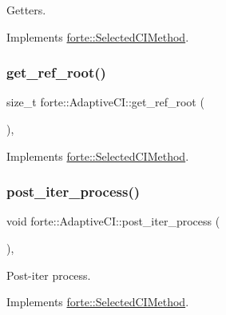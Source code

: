 Getters. 



Implements \mbox{\hyperlink{classforte_1_1_selected_c_i_method_a2c29d8700d6887860850f77b9246ec9f}{forte\+::\+Selected\+C\+I\+Method}}.

\mbox{\label{classforte_1_1_adaptive_c_i_a770022fec5ed4819e58670155e7fd5fc}} 
\subsubsection{\texorpdfstring{get\+\_\+ref\+\_\+root()}{get\_ref\_root()}}
{\footnotesize\ttfamily size\+\_\+t forte\+::\+Adaptive\+C\+I\+::get\+\_\+ref\+\_\+root (\begin{DoxyParamCaption}{ }\end{DoxyParamCaption})\hspace{0.3cm}{\ttfamily [override]}, {\ttfamily [virtual]}}



Implements \mbox{\hyperlink{classforte_1_1_selected_c_i_method_aa95ed581568b2d580c17ab166e85a11a}{forte\+::\+Selected\+C\+I\+Method}}.

\mbox{\label{classforte_1_1_adaptive_c_i_aebb7aa6e06ce5b45c4c5b2da1b1703c1}} 
\subsubsection{\texorpdfstring{post\+\_\+iter\+\_\+process()}{post\_iter\_process()}}
{\footnotesize\ttfamily void forte\+::\+Adaptive\+C\+I\+::post\+\_\+iter\+\_\+process (\begin{DoxyParamCaption}{ }\end{DoxyParamCaption})\hspace{0.3cm}{\ttfamily [override]}, {\ttfamily [virtual]}}



Post-\/iter process. 



Implements \mbox{\hyperlink{classforte_1_1_selected_c_i_method_a23ea3389ac1c62dee811decc5bea507f}{forte\+::\+Selected\+C\+I\+Method}}.

